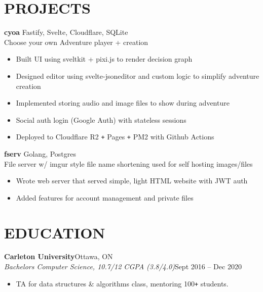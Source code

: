 \documentclass[letterpaper]{article}
\newcommand{\NewPart}[1]{\section*{\large\uppercase{\textbf{#1}}}}
\newcommand{\JobEntry}[3]{
	\normalsize\textbf{#1}\hfill\normalsize{#2}\\
	#3\vspace{0.1cm}
}
\newcommand{\DatedEntry}[3]{
	\small\textit{#1}\hfill\small{#2}\\
	\vspace{0.1cm}#3\vspace{0.1cm}
}
\newcommand{\ProjectEntry}[4]{\textbf{#1}
	\hfill \small{#2}\\
	#3\\\vspace{0.1cm}
	#4\vspace{0.1cm}
}
\begin{document}
\NewPart{Projects}
\ProjectEntry{cyoa}
{Fastify, Svelte, Cloudflare, SQLite}
{Choose your own Adventure player + creation}
{\begin{itemize}
	\item Built UI using sveltkit + pixi.js to render decision graph
	\item Designed editor using svelte-jsoneditor and custom logic to simplify adventure creation
	\item Implemented storing audio and image files to show during adventure
	\item Social auth login (Google Auth) with stateless sessions
	\item Deployed to Cloudflare R2 \texttt{+} Pages \texttt{+} PM2 with Github Actions
\end{itemize}}
\ProjectEntry{fserv}
{Golang, Postgres}
{File server w/ imgur style file name shortening used for self hosting images/files}
{\begin{itemize}
	\item Wrote web server that served simple, light HTML website with JWT auth
	\item Added features for account management and private files
\end{itemize}}\vspace{-0.3cm}

\NewPart{Education}
\JobEntry {Carleton University} {Ottawa, ON}
{\DatedEntry
{Bachelors Computer Science, 10.7/12 CGPA (3.8/4.0)}
{Sept 2016 -- Dec 2020}
{\begin{itemize}
	\item TA for data structures \& algorithms class, mentoring 100\texttt{+} students.
\end{itemize}}
}
\end{document}
